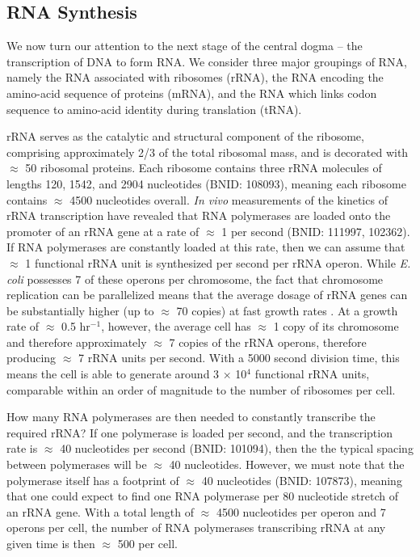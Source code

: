 \subsection{RNA Synthesis}\label{sec:RNA_synthesis}
We now turn our attention to the next stage of the central dogma -- the
transcription of DNA to form RNA. We consider three major groupings
of RNA, namely the RNA associated with ribosomes (rRNA), the RNA encoding the
amino-acid sequence of proteins (mRNA), and the RNA which links codon
sequence to amino-acid identity during translation (tRNA).


rRNA serves as the catalytic and structural component of the ribosome,
comprising approximately 2/3 of the total ribosomal mass, and is decorated
with $\approx$ 50 ribosomal proteins. Each ribosome contains three rRNA
molecules of lengths 120, 1542, and 2904 nucleotides (BNID: 108093), meaning
each ribosome contains $\approx$ 4500 nucleotides overall. \textit{In vivo}
measurements of the kinetics of rRNA transcription have revealed that RNA
polymerases are loaded onto the promoter of an rRNA gene at a rate of
$\approx$ 1 per second (BNID: 111997, 102362). If RNA polymerases are
constantly loaded at this rate, then we can assume that $\approx$ 1
functional rRNA unit is synthesized per second per rRNA operon. While
\textit{E. coli} possesses 7 of these operons per chromosome, the fact that
chromosome replication can be parallelized means that the average dosage of
rRNA genes can be substantially higher (up to $\approx$ 70 copies) at fast
growth rates \citep{dennis2004}. At a growth rate of $\approx$ 0.5 hr$^{-1}$, however, the
average cell has $\approx$ 1 copy of its chromosome and therefore
approximately $\approx$ 7 copies of the rRNA operons, therefore producing
$\approx$ 7 rRNA units per second. With a 5000 second division time, this
means the cell is able to generate around 3 $\times$ 10$^4$ functional rRNA
units, comparable within an order of magnitude to the number of ribosomes per
cell.

How many RNA polymerases are then needed to constantly transcribe the
required rRNA? If one polymerase is loaded per second, and the transcription
rate is $\approx$ 40 nucleotides per second (BNID: 101094), then the the
typical spacing between polymerases will be $\approx$ 40 nucleotides.
However, we must note that the polymerase itself has a footprint of $\approx$
40 nucleotides (BNID: 107873), meaning that one could expect to find one RNA
polymerase per 80 nucleotide stretch of an rRNA gene. With a total length of
$\approx$ 4500 nucleotides per operon and 7 operons per cell, the number of
RNA polymerases transcribing rRNA at any given time is then $\approx$ 500 per
cell.

